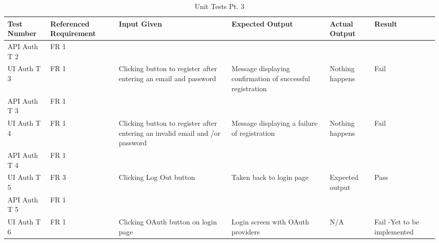 \documentclass[12pt, titlepage]{article}
\begin{document}
\begin{table}[!h]
\caption{Unit Tests Pt. 3}
\begin{adjustwidth}{-2cm}{-2cm}
\begin{tabularx}{500pt}{|K|K|K|K|K|K|}
	\hline 
	\textbf{Test Number} & \textbf{Referenced Requirement} & \textbf{Input Given} & \textbf{Expected Output} & \textbf{Actual Output} & \textbf{Result} \\
	\hline 
	API Auth T 2 & FR 1 &  &  &  &  \\
	\hline 
	UI Auth T 3 & FR 1 & Clicking button to register after entering an email and password & Message displaying confirmation of successful registration & Nothing happens & Fail \\
	\hline 
	API Auth T 3 & FR 1 &  &  &  &  \\
	\hline 
	UI Auth T 4 & FR 1 & Clicking button to register after entering an invalid email and /or password & Message displaying a failure of registration & Nothing happens & Fail \\
	\hline 
	API Auth T 4 & FR 1 &  &  &  &  \\
	\hline 
	UI Auth T 5 & FR 3 & Clicking Log Out button & Taken back to login page & Expected output & Pass \\
	\hline 
	API Auth T 5 & FR 1 &  &  &  &  \\
	\hline 
	UI Auth T 6 & FR 1 & Clicking OAuth button on login page & Login screen with OAuth providers & N/A & Fail -Yet to be implemented \\
	\hline
\end{tabularx}
\end{adjustwidth}	
\end{table}
\end{document}
